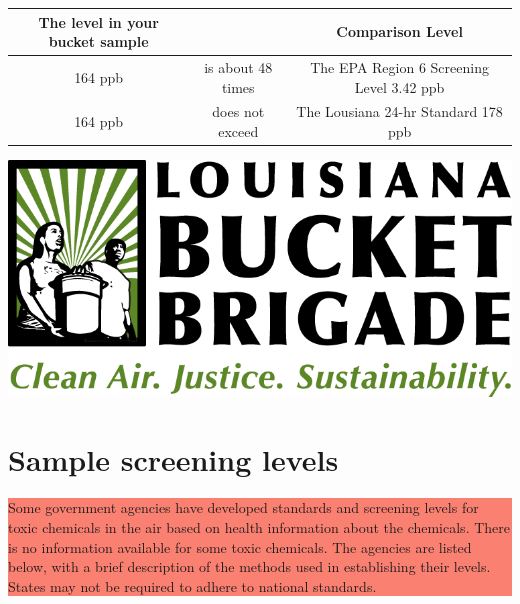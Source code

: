 \documentclass{article}
\newcommand{\highlightbox}[1]{\colorbox{salmon}{\parbox{\linewidth}{#1}}}
\begin{document}
\begin{tabular}{|c|c|c|}
\hline
The level in your bucket sample &                   & Comparison Level                             \\
\hline
164 ppb                        & is about 48 times  & The EPA Region 6 Screening Level 3.42 ppb    \\
\hline
164 ppb                        & does not exceed    & The Lousiana 24-hr Standard 178 ppb           \\
\hline
\end{tabular}



\newpage
\includegraphics{logo}
\section*{Sample screening levels}

\highlightbox{Some government agencies have developed standards and screening levels for
toxic chemicals in the air based on health information about the chemicals.
There is no information available for some toxic chemicals. The agencies are
listed below, with a brief description of the methods used in establishing their
levels. States may not be required to adhere to national standards.}
\end{document}
